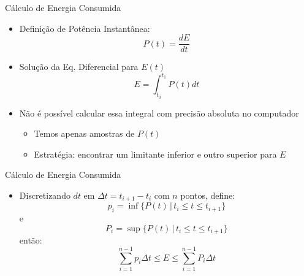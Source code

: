 \begin{frame}{Cálculo de Energia Consumida}
    \begin{itemize}
        \item Definição de Potência Instantânea:
            $$P(t) = \frac{dE}{dt}$$
        \item Solução da Eq. Diferencial para $E(t)$
            $$E = \int_{t_0}^{t_1} P(t) dt$$

        \item Não é possível calcular essa integral com precisão absoluta no computador
            \begin{itemize}
                \item Temos apenas amostras de $P(t)$
                \item Estratégia: encontrar um limitante inferior e outro superior para $E$
            \end{itemize}
    \end{itemize}
\end{frame}

\begin{frame}{Cálculo de Energia Consumida}
    \begin{itemize}
        \item Discretizando $dt$ em $\Delta t = t_{i+1} - t_{i}$ com $n$ pontos, define:
            $$p_i = \inf\{P(t)\,|\,t_{i} \leq t \leq t_{i+1}\}$$
            \hfil\hfil e \hfil\hfil
            $$P_i = \sup\{P(t)\,|\,t_{i} \leq t \leq t_{i+1}\}$$
            \hfil\hfil então: \hfil\hfil
            $$\sum_{i=1}^{n-1} p_i\Delta t \leq E \leq \sum_{i=1}^{n-1} P_i\Delta t$$

    \end{itemize}
\end{frame}
